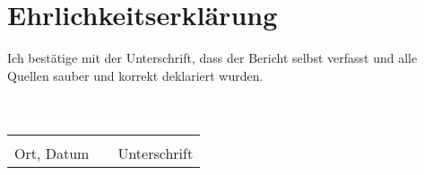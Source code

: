 \section{Ehrlichkeitserkl\"arung}
Ich bestätige mit der Unterschrift, dass der Bericht selbst verfasst und alle Quellen sauber und korrekt deklariert wurden.\\
\\
\\


\begin{tabular}{lp{23em}l}
 \hspace{3cm}   && \hspace{3cm} \\\cline{1-1}\cline{3-3}
 Ort, Datum     && Unterschrift
\end{tabular}

\newpage